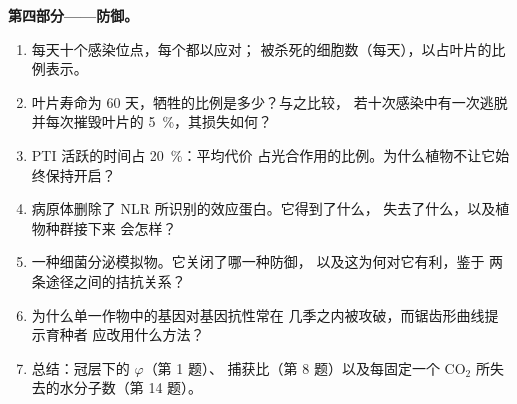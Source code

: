 \begin{problem}
\medskip
\noindent\textbf{第四部分——防御。}
\begin{enumerate}[resume]
  \item 每天十个感染位点，每个都以应对；
        被杀死的细胞数（每天），以占叶片的比例表示。
  \item 叶片寿命为 60 天，牺牲的比例是多少？与之比较，
        若十次感染中有一次逃脱并每次摧毁叶片的
        \qty{5}{\%}，其损失如何？
  \item PTI 活跃的时间占 \qty{20}{\%}：平均代价
        占光合作用的比例。为什么植物不让它始终保持开启？
  \item 病原体删除了 NLR 所识别的效应蛋白。它得到了什么，
        失去了什么，以及植物种群接下来
        会怎样？
  \item 一种细菌分泌模拟物。它关闭了哪一种防御，
        以及这为何对它有利，鉴于
        两条途径之间的拮抗关系？
  \item 为什么单一作物中的基因对基因抗性常在
        几季之内被攻破，而锯齿形曲线提示育种者
        应改用什么方法？
  \item 总结：冠层下的 $\varphi$（第 1 题）、
        捕获比（第 8 题）以及每固定一个
        CO$_{2}$ 所失去的水分子数（第 14 题）。
\end{enumerate}
\end{problem}
